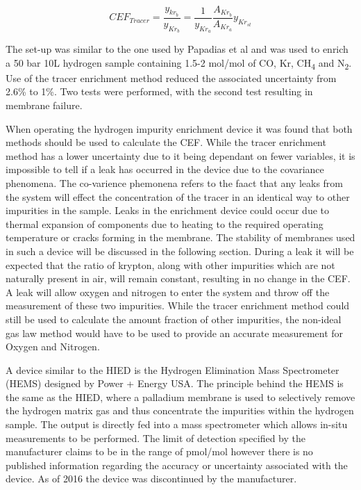 \begin{equation} \label{eq:3}
    CEF_{Tracer} = \frac{y_{kr_b}}{y_{Kr_b}} = \frac{1}{y_{Kr_a}} \frac{A_{Kr_b}}{A_{Kr_a}} y_{Kr_{st}}
\end{equation}

The set-up was similar to the one used by Papadias et al \cite{Ahmed2010} and was used to enrich a 50 bar 10L hydrogen sample 
containing 1.5-2 \textmu mol/mol of CO, Kr, CH\textsubscript{4} and N\textsubscript{2}. Use of the tracer enrichment 
method reduced the associated uncertainty from 2.6\% to 1\%. 
Two tests were performed, with the second test resulting in membrane failure. 

When operating the hydrogen impurity enrichment device it was found that both methods should be used to 
calculate the CEF.\cite{Murugan2014, Murugan2015} While the tracer enrichment method has a lower uncertainty 
due to it being dependant on fewer variables, it is impossible to tell if a leak has occurred in the device 
due to the covariance 
phenomena. \cite{Murugan2014} The co-varience phemonena refers to the faact that any leaks from the system will effect the concentration of the tracer in an identical way to other impurities in the sample. Leaks in the enrichment device could occur due to thermal expansion of components due to heating 
to the required operating temperature or cracks forming in the membrane. The stability of membranes used in 
such a device will be discussed in the following section. During a leak it will be expected that the ratio of 
krypton, along with other impurities which are not naturally present in air, will remain constant, resulting 
in no change in the CEF. A leak will allow oxygen and nitrogen to enter the system and throw off the 
measurement of these two impurities. While the tracer enrichment method could still be used to calculate 
the amount fraction of other impurities, the non-ideal gas law method would have to be used to provide an 
accurate measurement for Oxygen and Nitrogen.

A device similar to the HIED is the Hydrogen Elimination Mass Spectrometer (HEMS) designed by Power + Energy USA. \cite{Bossard} 
The principle behind the HEMS is the same as the HIED, where a palladium membrane is used to selectively 
remove the hydrogen matrix gas and thus concentrate the impurities within the hydrogen sample. 
The output is directly fed into a mass spectrometer which allows in-situ measurements to be performed. 
The limit of detection specified by the manufacturer claims to be in the range of pmol/mol however there is 
no published information regarding the accuracy or uncertainty associated with the device. 
As of 2016 the device was discontinued by the manufacturer.


